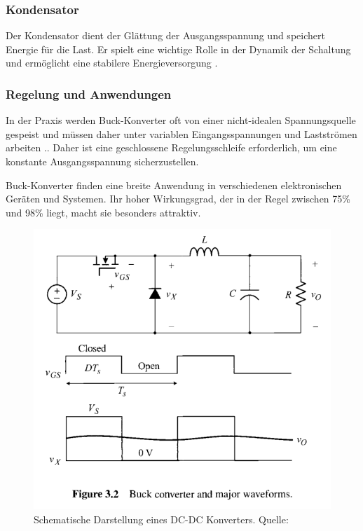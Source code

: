 \subsubsection{Kondensator}
Der Kondensator dient der Glättung der Ausgangsspannung und speichert Energie für die Last. Er spielt eine wichtige Rolle in der Dynamik der Schaltung und ermöglicht eine stabilere Energieversorgung \cite[p.~54]{Kularatna2012}.
\subsubsection{Regelung und Anwendungen}

In der Praxis werden Buck-Konverter oft von einer nicht-idealen Spannungsquelle gespeist und müssen daher unter variablen Eingangsspannungen und Lastströmen arbeiten \cite[p.~124,120,113]{choi2013pulsewidth}.. Daher ist eine geschlossene Regelungsschleife erforderlich, um eine konstante Ausgangsspannung sicherzustellen.

Buck-Konverter finden eine breite Anwendung in verschiedenen elektronischen Geräten und Systemen. Ihr hoher Wirkungsgrad, der in der Regel zwischen 75\% und 98\% liegt, macht sie besonders attraktiv.


\begin{figure}[htbp]
    \centering
    \includegraphics[width=0.7\linewidth]{2Grundlagen/111DCDC.png}
    \caption{Schematische Darstellung eines DC-DC Konverters. Quelle: \cite[Seite 88]{choi2013pulsewidth}}
    \label{fig:dcdc_converter}
\end{figure}



